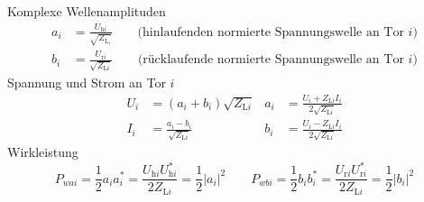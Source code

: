 \documentclass[10pt,a4paper,fleqn,landscape]{article}
\begin{document}
\begin{multicols}{2}
Komplexe Wellenamplituden
	\begin{align*}
		a_i&=\frac{U_{\text{h}i}}{\sqrt{Z_{\text{L}_i}}} \qquad \text{(hinlaufenden normierte Spannungswelle an Tor $i$)}\\
		b_i&=\frac{U_{\text{r}i}}{\sqrt{Z_{\text{L}i}}} \qquad \text{(rücklaufende normierte Spannungswelle an Tor $i$)}
	\end{align*}
Spannung und Strom an Tor $i$
	\begin{align*}
		U_i&=(a_i+b_i)\sqrt{Z_{\text{L}i}} & a_i&=\frac{U_i+Z_{\text{L}i}I_i}{2\sqrt{Z_{\text{L}i}}} \\
		I_i&=\frac{a_i-b_i}{\sqrt{Z_{\text{L}i}}} & b_i&=\frac{U_i-Z_{\text{L}i}I_i}{2\sqrt{Z_{\text{L}i}}}
	\end{align*}
Wirkleistung
	\begin{equation*}
		P_{wai}=\frac{1}{2}a_ia_i^*=\frac{U_{\text{h}i}U_{\text{h}i}^*}{2Z_{\text{L}i}}=\frac{1}{2}|a_i|^2 \qquad P_{wbi}=\frac{1}{2}b_ib_i^*=\frac{U_{\text{r}i}U_{\text{r}i}^*}{2Z_{\text{L}i}}=\frac{1}{2}|b_i|^2
	\end{equation*}

\end{multicols}
\end{document}
